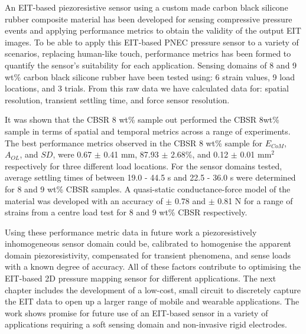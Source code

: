 
An EIT-based piezoresistive sensor using a custom made carbon black silicone rubber composite material has been developed for sensing compressive pressure events and applying performance metrics to obtain the validity of the output EIT images. To be able to apply this EIT-based PNEC pressure sensor to a variety of scenarios, replacing human-like touch, performance metrics has been formed to quantify the sensor's suitability for each application. Sensing domains of 8 and 9 wt\% carbon black silicone rubber have been tested using: 6 strain values, 9 load locations, and 3 trials. From this raw data we have calculated data for: spatial resolution, transient settling time, and force sensor resolution. 

It was shown that the CBSR 8 wt\% sample out performed the CBSR 8wt\% sample in terms of spatial and temporal metrics across a range of experiments. The best performance metrics observed in the CBSR 8 wt\% sample for $E_{CoM}$, $A_{OL}$, and $S\!D$, were 0.67 $\pm$ 0.41 mm, 87.93 $\pm$ 2.68\%, and 0.12 $\pm$ 0.01 mm$^2$ respectively for three different load locations. For the sensor domains tested, average settling times of between 19.0 - 44.5 s and 22.5 - 36.0 s were determined for 8 and 9 wt\% CBSR samples. A quasi-static conductance-force model of the material was developed with an accuracy of  $\pm$ 0.78 and  $\pm$ 0.81 N for a range of strains from a centre load test for 8 and 9 wt\% CBSR respectively.

Using these performance metric data in future work a piezoresistively inhomogeneous sensor domain could be, calibrated to homogenise the apparent domain piezoresistivity, compensated for transient phenomena, and sense loads with a known degree of accuracy. All of these factors contribute to optimising the EIT-based 2D pressure mapping sensor for different applications. The next chapter includes the development of a low-cost, small circuit to discretely capture the EIT data to open up a larger range of mobile and wearable applications. The work shows promise for future use of an EIT-based sensor in a variety of applications requiring a soft sensing domain and non-invasive rigid electrodes.

\afterpage{\blankpage}